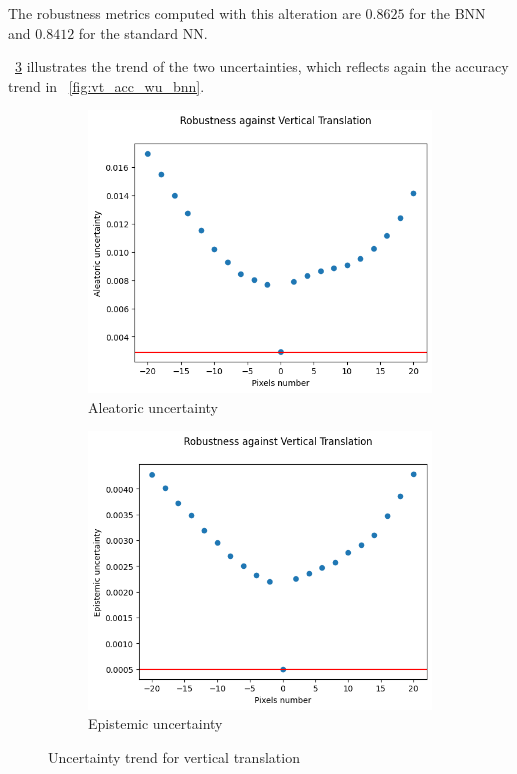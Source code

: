 The robustness metrics computed with this alteration are $0.8625$ for the BNN and $0.8412$ for the standard NN.

\Fig~\ref{fig:vt_uncertainty} illustrates the trend of the two uncertainties, which reflects again the accuracy trend in \Fig~\ref{fig:vt_acc_wu_bnn}.

\begin{figure}[h]
	\centering
	\begin{subfigure}{.5\textwidth}
		\centering
		\includegraphics[width=0.8\linewidth]{ImageFiles/EvalBNN/VT/aleatoric}
		\caption{Aleatoric uncertainty}
		\label{fig:vt_aleatoric}
	\end{subfigure}%
	\begin{subfigure}{.5\textwidth}
		\centering
		\includegraphics[width=0.8\linewidth]{ImageFiles/EvalBNN/VT/epistemic}
		\caption{Epistemic uncertainty}
		\label{fig:vt_epistemic}
	\end{subfigure}
	\caption{Uncertainty trend for vertical translation}
	\label{fig:vt_uncertainty}
\end{figure}

